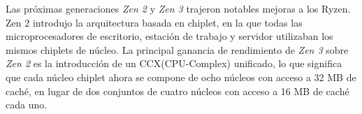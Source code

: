 Las próximas generaciones  \emph{Zen 2} y \emph{Zen 3}  trajeron notables mejoras a los Ryzen. Zen 2 introdujo la arquitectura basada en chiplet, 
en la que todas las microprocesadores de escritorio, estación de trabajo y servidor utilizaban los mismos chiplets de núcleo. La principal ganancia 
de rendimiento de \emph{Zen 3} sobre \emph{Zen 2} es la introducción de un CCX(CPU-Complex) unificado, lo que significa que cada núcleo chiplet ahora se compone de ocho núcleos 
con acceso a 32 MB de caché, en lugar de dos conjuntos de cuatro núcleos con acceso a 16 MB de caché cada uno.
